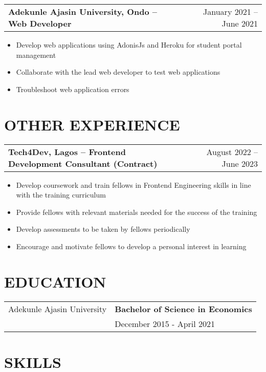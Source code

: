 \documentclass[a4paper,12pt]{article}
\makeatletter
\newenvironment{joblong}[2]
    {
    \begin{tabularx}{\linewidth}{@{}l X r@{}}
    \textbf{#1} & \hfill &  #2 \\[3.75pt]
    \end{tabularx}
    \begin{minipage}[t]{\linewidth}
    \begin{itemize}[nosep,after=\strut, leftmargin=1em, itemsep=3pt,label=--]
    }
    {
    \end{itemize}
    \end{minipage}    
    }
\makeatother
\begin{document}
\begin{joblong}{Adekunle Ajasin University, Ondo -- Web Developer}{January 2021 -- June 2021}
\item Develop web applications using AdonisJs and Heroku for student portal management
\item Collaborate with the lead web developer to test web applications
\item Troubleshoot web application errors
\end{joblong}

\section{OTHER EXPERIENCE}

\begin{joblong}{Tech4Dev, Lagos -- Frontend Development Consultant (Contract)}{August 2022 -- June 2023}
\item Develop coursework and train fellows in Frontend Engineering skills in line with the training curriculum
\item Provide fellows with relevant materials needed for the success of the training
\item Develop assessments to be taken by fellows periodically
\item Encourage and motivate fellows to develop a personal interest in learning
\end{joblong}

\section{EDUCATION}

\begin{tabularx}{\linewidth}{@{}l X@{}}
Adekunle Ajasin University & \textbf{Bachelor of Science in Economics} \\
                          & December 2015 - April 2021 \\[10pt]
\end{tabularx}

\section{SKILLS}
\end{document}
